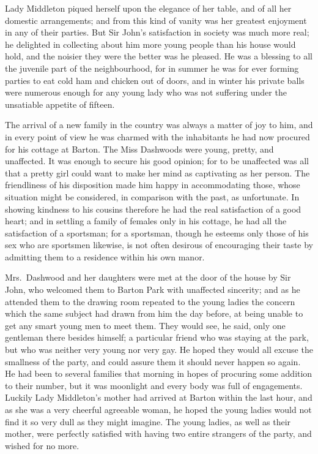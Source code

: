 \documentclass{article}
\begin{document}
Lady Middleton piqued herself upon the elegance
of her table, and of all her domestic arrangements;
and from this kind of vanity was her greatest enjoyment
in any of their parties.  But Sir John's satisfaction
in society was much more real; he delighted in collecting
about him more young people than his house would hold,
and the noisier they were the better was he pleased.
He was a blessing to all the juvenile part of the neighbourhood,
for in summer he was for ever forming parties to eat cold
ham and chicken out of doors, and in winter his private
balls were numerous enough for any young lady who was not
suffering under the unsatiable appetite of fifteen.

The arrival of a new family in the country was always
a matter of joy to him, and in every point of view he was
charmed with the inhabitants he had now procured for his
cottage at Barton.  The Miss Dashwoods were young, pretty,
and unaffected.  It was enough to secure his good opinion;
for to be unaffected was all that a pretty girl could
want to make her mind as captivating as her person.
The friendliness of his disposition made him happy in
accommodating those, whose situation might be considered,
in comparison with the past, as unfortunate.  In showing
kindness to his cousins therefore he had the real satisfaction
of a good heart; and in settling a family of females only
in his cottage, he had all the satisfaction of a sportsman;
for a sportsman, though he esteems only those of his sex who
are sportsmen likewise, is not often desirous of encouraging
their taste by admitting them to a residence within his own
manor.

Mrs.\ Dashwood and her daughters were met at the door
of the house by Sir John, who welcomed them to Barton
Park with unaffected sincerity; and as he attended them
to the drawing room repeated to the young ladies the concern
which the same subject had drawn from him the day before,
at being unable to get any smart young men to meet them.
They would see, he said, only one gentleman there
besides himself; a particular friend who was staying at
the park, but who was neither very young nor very gay.
He hoped they would all excuse the smallness of the party,
and could assure them it should never happen so again.
He had been to several families that morning in hopes
of procuring some addition to their number, but it
was moonlight and every body was full of engagements.
Luckily Lady Middleton's mother had arrived at Barton
within the last hour, and as she was a very cheerful
agreeable woman, he hoped the young ladies would not find
it so very dull as they might imagine.  The young ladies,
as well as their mother, were perfectly satisfied with
having two entire strangers of the party, and wished for
no more.
\end{document}
